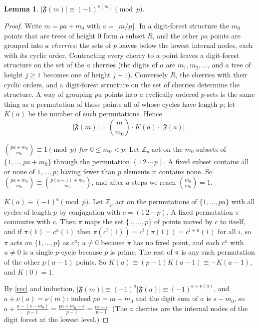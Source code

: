 \documentclass[11pt]{article}
\newtheorem{lemma}{Lemma}
\theoremstyle{remark}
\newcommand{\Z}{\mathbb Z}
\newcommand{\F}{\mathfrak F}
\begin{document}
\begin{lemma}\label{L4}
$|\F(m)|\equiv(-1)^{\nu(m)}\pmod p$.
\end{lemma}
\begin{proof}
Write $m=pa+m_0$ with $a=\lfloor m/p\rfloor$. In a digit-forest structure the $m_0$ points
that are trees of height $0$ form a subset $R$, and the other $pa$ points are grouped into $a$
\emph{cherries}: the sets of $p$ leaves below the lowest internal nodes, each with its cyclic
order. Contracting every cherry to a point leaves a digit-forest structure on the set of the
$a$ cherries (the digits of $a$ are $m_1,m_2,\dots$, and a tree of height $j\ge1$ becomes one
of height $j-1$). Conversely $R$, the cherries with their cyclic orders, and a digit-forest
structure on the set of cherries determine the structure. A way of grouping $pa$ points into
$a$ cyclically ordered $p$-sets is the same thing as a permutation of those points all of
whose cycles have length $p$; let $K(a)$ be the number of such permutations. Hence
\begin{equation}\label{rec}
 |\F(m)|=\binom{m}{m_0}\cdot K(a)\cdot|\F(a)| .
\end{equation}

\emph{$\binom{pa+m_0}{m_0}\equiv1\pmod p$ for $0\le m_0<p$.} Let $\Z_p$ act on the
$m_0$-subsets of $\{1,\dots,pa+m_0\}$ through the permutation $(1\,2\,\cdots\,p)$. A fixed
subset contains all or none of $1,\dots,p$; having fewer than $p$ elements it contains none.
So $\binom{pa+m_0}{m_0}\equiv\binom{p(a-1)+m_0}{m_0}$, and after $a$ steps we reach
$\binom{m_0}{m_0}=1$.

\emph{$K(a)\equiv(-1)^a\pmod p$.} Let $\Z_p$ act on the permutations of $\{1,\dots,pa\}$ with
all cycles of length $p$ by conjugation with $c=(1\,2\,\cdots\,p)$. A fixed permutation $\pi$
commutes with $c$. Then $\pi$ maps the set $\{1,\dots,p\}$ of points moved by $c$ to itself,
and if $\pi(1)=c^u(1)$ then $\pi(c^i(1))=c^i(\pi(1))=c^{i+u}(1)$ for all $i$, so $\pi$ acts on
$\{1,\dots,p\}$ as $c^u$; $u\ne0$ because $\pi$ has no fixed point, and each $c^u$ with
$u\ne0$ is a single $p$-cycle because $p$ is prime. The rest of $\pi$ is any such permutation of the other
$p(a-1)$ points. So $K(a)\equiv(p-1)K(a-1)\equiv-K(a-1)$, and $K(0)=1$.

By \eqref{rec} and induction, $|\F(m)|\equiv(-1)^a|\F(a)|\equiv(-1)^{a+\nu(a)}$, and
$a+\nu(a)=\nu(m)$: indeed $pa=m-m_0$ and the digit sum of $a$ is $s-m_0$, so
$a+\frac{a-(s-m_0)}{p-1}=\frac{pa+m_0-s}{p-1}=\frac{m-s}{p-1}$. (The $a$ cherries are the
internal nodes of the digit forest at the lowest level.)
\end{proof}
\end{document}
